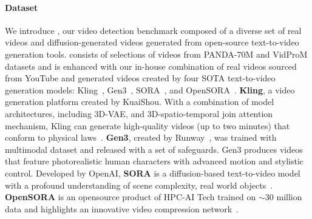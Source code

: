 \paragraph{Dataset}
We introduce \vidfor, our video detection benchmark composed of a diverse set of real videos and diffusion-generated videos generated from open-source text-to-video generation tools. 
\vidfor consists of selections of videos from PANDA-70M and VidProM datasets and is enhanced with our in-house combination of real videos sourced from YouTube and generated videos created by four SOTA text-to-video generation models: Kling~\cite{klingai}, Gen3~\cite{runway3}, SORA~\cite{openaisora}, and OpenSORA~\cite{opensora}. 
\textbf{Kling}, a video generation platform created by KuaiShou. With a combination of model architectures, including 3D-VAE, and 3D-spatio-temporal join attention mechanism,  Kling can generate high-quality videos (up to two minutes) that conform to physical laws~\cite{klingai}.
\textbf{Gen3}, created by Runway~\cite{runway3}, was trained with multimodal dataset and released with a set of safeguards. Gen3 produces videos that feature photorealistic human characters with advanced motion and stylistic control.
Developed by OpenAI, \textbf{SORA} is a diffusion-based text-to-video model with a profound understanding of scene complexity, real world objects~\cite{openaisora,videoworldsimulators2024}. \textbf{OpenSORA} is an opensource product of HPC-AI Tech trained on $\sim$30 million data and highlights an innovative video compression network~\cite{opensora}.


